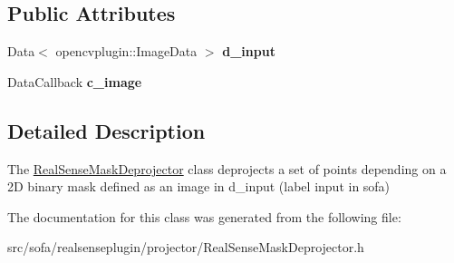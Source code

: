 \subsection*{Public Attributes}
\begin{DoxyCompactItemize}
\item 
\mbox{\label{classsofa_1_1rgbdtracking_1_1_real_sense_mask_deprojector_ada97b307e34090d3fb987124a936459b}} 
Data$<$ opencvplugin\+::\+Image\+Data $>$ {\bfseries d\+\_\+input}
\item 
\mbox{\label{classsofa_1_1rgbdtracking_1_1_real_sense_mask_deprojector_a5ef4d4dff52a6f68a3153fbfb9599a4f}} 
Data\+Callback {\bfseries c\+\_\+image}
\end{DoxyCompactItemize}


\subsection{Detailed Description}
The \hyperlink{classsofa_1_1rgbdtracking_1_1_real_sense_mask_deprojector}{Real\+Sense\+Mask\+Deprojector} class deprojects a set of points depending on a 2D binary mask defined as an image in d\+\_\+input (label input in sofa) 

The documentation for this class was generated from the following file\+:\begin{DoxyCompactItemize}
\item 
src/sofa/realsenseplugin/projector/Real\+Sense\+Mask\+Deprojector.\+h\end{DoxyCompactItemize}
